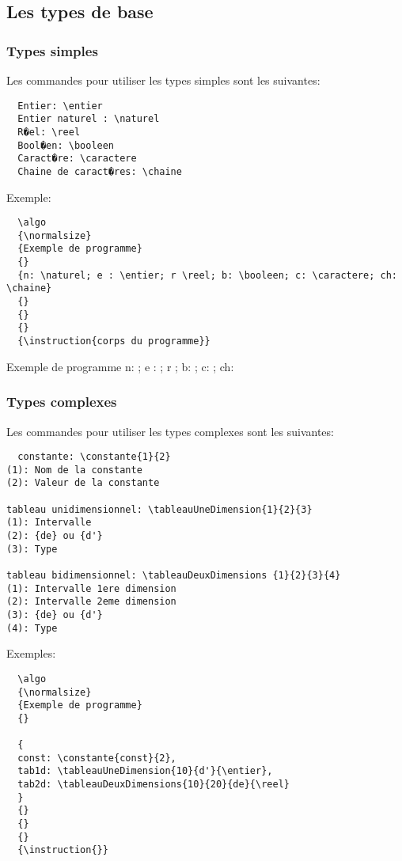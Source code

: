 \documentclass[a4paper,12pt]{report}
\begin{document}
\subsection{Les types de base}

\subsubsection{Types simples}

Les commandes pour utiliser les types simples sont les suivantes:
\begin{lstlisting}
  Entier: \entier
  Entier naturel : \naturel
  R�el: \reel
  Bool�en: \booleen
  Caract�re: \caractere
  Chaine de caract�res: \chaine
\end{lstlisting}

Exemple:

\begin{lstlisting}
  \algo
  {\normalsize}
  {Exemple de programme}
  {}
  {n: \naturel; e : \entier; r \reel; b: \booleen; c: \caractere; ch: \chaine}
  {}
  {}
  {}
  {\instruction{corps du programme}}

\end{lstlisting}

\begin{algorithme}
  \algo
  {\normalsize}
  {Exemple de programme}
  {}
  {n: \naturel; e : \entier; r \reel; b: \booleen; c: \caractere; ch: \chaine}
  {}
  {}
  {} 
  {}

\end{algorithme}

\subsubsection{Types complexes}

Les commandes pour utiliser les types complexes sont les suivantes:
\begin{lstlisting}
  constante: \constante{1}{2}
(1): Nom de la constante
(2): Valeur de la constante

tableau unidimensionnel: \tableauUneDimension{1}{2}{3}
(1): Intervalle
(2): {de} ou {d'}
(3): Type

tableau bidimensionnel: \tableauDeuxDimensions {1}{2}{3}{4}
(1): Intervalle 1ere dimension
(2): Intervalle 2eme dimension
(3): {de} ou {d'}
(4): Type

\end{lstlisting}

 Exemples:
\begin{lstlisting}
  \algo
  {\normalsize}
  {Exemple de programme}
  {}
  
  {
  const: \constante{const}{2},
  tab1d: \tableauUneDimension{10}{d'}{\entier},
  tab2d: \tableauDeuxDimensions{10}{20}{de}{\reel}
  }
  {}
  {}
  {}
  {\instruction{}}

\end{lstlisting}
\end{document}
